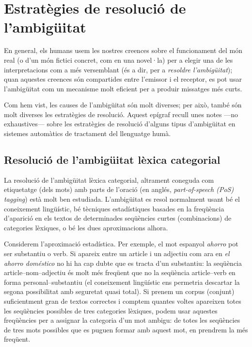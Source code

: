 \section{Estratègies de resolució de l'ambigüitat}

En general, els humans usem les nostres creences sobre el funcionament
del món real (o d'un món fictici concret, com en una novel·la) per a
elegir una de les interpretacions com a més versemblant (és a dir, per
a \emph{resoldre l'ambigüitat}); quan aquestes creences són compartides
entre l'emissor i el receptor, es pot usar l'ambigüitat com un
mecanisme molt eficient per a produir missatges més curts.

Com hem vist, les causes de l'ambigüitat són molt diverses; per això,
també són molt diverses les estratègies de resolució. Aquest epígraf
recull unes notes ---no exhaustives--- sobre les estratègies de
resolució d'alguns tipus d'ambigüitat en sistemes automàtics de
tractament del llenguatge humà.

\subsection{Resolució de l'ambigüitat lèxica categorial} 
\label{s3:reshom}

La resolució de l'ambigüitat lèxica categorial, altrament coneguda com
etiquetatge (dels mots) amb parts de l'oració (en anglés,
\emph{part-of-speech (PoS) tagging}) està molt ben estudiada.
L'ambigüitat es resol normalment usant bé el coneixement lingüístic,
bé tècniques estadístiques basades en la freqüència d'aparició en els
textos de determinades seqüències curtes (combinacions) de categories
lèxiques, o bé les dues aproximacions alhora.


Considerem l'aproximació estadística. Per exemple, el mot espanyol
\emph{ahorro} pot ser substantiu o verb. Si apareix entre un article i
un adjectiu com ara en \emph{el ahorro doméstico} no hi ha cap dubte
que es tracta d'un substantiu: la seqüència article--nom--adjectiu és
molt més freqüent que no la seqüència article--verb en forma
personal--substantiu (el coneixement lingüístic ens permetria
descartar la segona possibilitat amb seguretat quasi total). Si prenem
un corpus (conjunt) suficientment gran de textos correctes i comptem
quantes voltes apareixen totes les seqüències possibles de tres
categories lèxiques, podem usar aquestes freqüències per a assignar la
categoria d'un mot ambigu: de totes les seqüències de tres mots
possibles que es puguen formar amb aquest mot, en prendrem la més
freqüent. 


